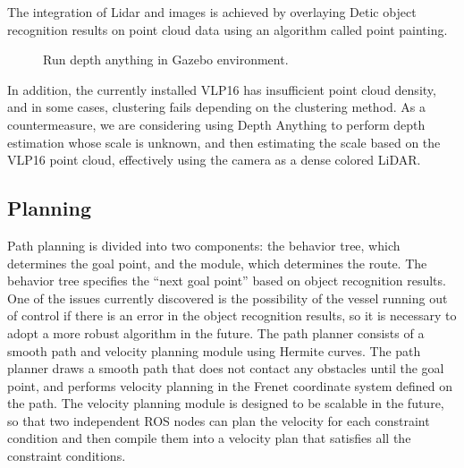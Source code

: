 \documentclass[lettersize,journal]{IEEEtran}
\begin{document}
The integration of Lidar and images is achieved by overlaying Detic object recognition results on point cloud data using an algorithm called point painting.

\begin{figure}[H]
  \begin{center}
  \end{center}
  \caption{Run depth anything in Gazebo environment.}
  \label{fig:arch_nav}
\end{figure}

In addition, the currently installed VLP16 has insufficient point cloud density, and in some cases, clustering fails depending on the clustering method.
As a countermeasure, we are considering using Depth Anything to perform depth estimation whose scale is unknown, and then estimating the scale based on the VLP16 point cloud, effectively using the camera as a dense colored LiDAR.

\subsection{Planning}

Path planning is divided into two components: the behavior tree, which determines the goal point, and the module, which determines the route.
The behavior tree specifies the “next goal point” based on object recognition results.
One of the issues currently discovered is the possibility of the vessel running out of control if there is an error in the object recognition results, so it is necessary to adopt a more robust algorithm in the future.
The path planner consists of a smooth path and velocity planning module using Hermite curves.
The path planner draws a smooth path that does not contact any obstacles until the goal point, and performs velocity planning in the Frenet coordinate system defined on the path.
The velocity planning module is designed to be scalable in the future, so that two independent ROS nodes can plan the velocity for each constraint condition and then compile them into a velocity plan that satisfies all the constraint conditions.
\end{document}
